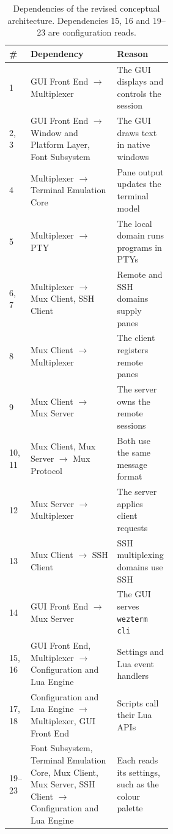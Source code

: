 \begin{table}[!htbp]
  \centering
  \caption{Dependencies of the revised conceptual architecture. Dependencies 15, 16 and 19--23 are configuration reads.}
  \label{tab:dependencies}
  \footnotesize
  \begin{tabularx}{\linewidth}{@{}l>{\raggedright\arraybackslash}p{0.53\linewidth}>{\raggedright\arraybackslash}X@{}}
    \toprule
    \textbf{\#} & \textbf{Dependency} & \textbf{Reason} \\
    \midrule
    1 & GUI Front End $\rightarrow$ Multiplexer & The GUI displays and controls the session \\
    2, 3 & GUI Front End $\rightarrow$ Window and Platform Layer, Font Subsystem & The GUI draws text in native windows \\
    4 & Multiplexer $\rightarrow$ Terminal Emulation Core & Pane output updates the terminal model \\
    5 & Multiplexer $\rightarrow$ PTY & The local domain runs programs in PTYs \\
    6, 7 & Multiplexer $\rightarrow$ Mux Client, SSH Client & Remote and SSH domains supply panes \\
    8 & Mux Client $\rightarrow$ Multiplexer & The client registers remote panes \\
    9 & Mux Client $\rightarrow$ Mux Server & The server owns the remote sessions \\
    10, 11 & Mux Client, Mux Server $\rightarrow$ Mux Protocol & Both use the same message format \\
    12 & Mux Server $\rightarrow$ Multiplexer & The server applies client requests \\
    13 & Mux Client $\rightarrow$ SSH Client & SSH multiplexing domains use SSH \\
    14 & GUI Front End $\rightarrow$ Mux Server & The GUI serves \texttt{wezterm cli} \\
    15, 16 & GUI Front End, Multiplexer $\rightarrow$ Configuration and Lua Engine & Settings and Lua event handlers \\
    17, 18 & Configuration and Lua Engine $\rightarrow$ Multiplexer, GUI Front End & Scripts call their Lua APIs \\
    19--23 & Font Subsystem, Terminal Emulation Core, Mux Client, Mux Server, SSH Client $\rightarrow$ Configuration and Lua Engine & Each reads its settings, such as the colour palette \\
    \bottomrule
  \end{tabularx}
\end{table}
